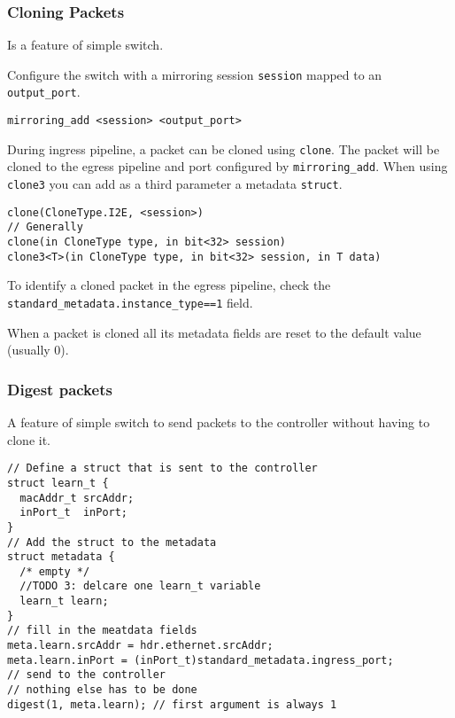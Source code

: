 \documentclass[a4paper, fontsize=8pt, landscape, DIV=1]{scrartcl}
\begin{document}
\begin{multicols*}{3}
  \subsubsection{Cloning Packets}
  Is a feature of simple switch.

  Configure the switch with a mirroring session \texttt{session} mapped to an \texttt{output\_port}.
  \begin{lstlisting}[style=P4style]
mirroring_add <session> <output_port>\end{lstlisting}

  During ingress pipeline, a packet can be cloned using \texttt{clone}. The packet will be cloned to the egress pipeline and port configured by \texttt{mirroring\_add}. When using \texttt{clone3} you can add as a third parameter a metadata \texttt{struct}.
  \begin{lstlisting}[style=P4style]
clone(CloneType.I2E, <session>)
// Generally
clone(in CloneType type, in bit<32> session)
clone3<T>(in CloneType type, in bit<32> session, in T data)\end{lstlisting}

  To identify a cloned packet in the egress pipeline, check the \texttt{standard\_metadata.instance\_type==1} field.

  When a packet is cloned all its metadata fields
  are reset to the default value (usually 0).


  \subsubsection{Digest packets}
  A feature of simple switch to send packets to the controller without having to clone it.

  \begin{lstlisting}[style=P4style]
// Define a struct that is sent to the controller
struct learn_t {
  macAddr_t srcAddr;
  inPort_t  inPort;
}
// Add the struct to the metadata
struct metadata {
  /* empty */
  //TODO 3: delcare one learn_t variable
  learn_t learn;
}
// fill in the meatdata fields
meta.learn.srcAddr = hdr.ethernet.srcAddr;
meta.learn.inPort = (inPort_t)standard_metadata.ingress_port;
// send to the controller
// nothing else has to be done
digest(1, meta.learn); // first argument is always 1\end{lstlisting}

  
\end{multicols*}

\setcounter{secnumdepth}{2}
\end{document}
